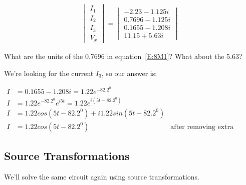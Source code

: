 \begin{align}
\begin{vmatrix}I_1\\I_2\\I_3\\V_x \end{vmatrix} =
\begin{vmatrix} -2.23-1.125i\\0.7696-1.125i \\0.1655-1.208i \\11.15+5.63i \end{vmatrix} \label{E:8M1}
\end{align}

\begin{alevel}
What are the units of the 0.7696 in equation~\ref{E:8M1}? What about the 5.63?
\end{alevel}

We're looking for the current $I_3$, so our answer is:

\begin{align*}
I&=0.1655-1.208i =1.22e^{-82.2^0}\\
I &= 1.22e^{-82.2^0}e^{i5t}=1.22e^{i(5t-82.2^0)}\\
I&=1.22cos(5t-82.2^0)+i1.22sin(5t-82.2^0)\\
I&=1.22cos(5t-82.2^0) &\text{after removing extra source term}
\end{align*}

\subsection{Source Transformations}
We'll solve the same circuit again using source transformations.

